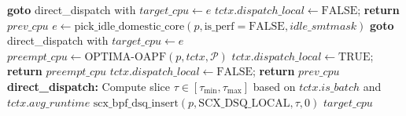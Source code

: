 \documentclass[conference]{IEEEtran}
\begin{document}
\begin{algorithm*}[t]
\begin{algorithmic}[1]
            \STATE \textbf{goto} direct\_dispatch with $target\_cpu \leftarrow e$
        \ENDIF
    \ENDIF
    \STATE $tctx.dispatch\_local \leftarrow \text{FALSE}$; \textbf{return} $prev\_cpu$
\ENDIF
\STATE $e \leftarrow \text{pick\_idle\_domestic\_core}(p, \text{is\_perf}=\text{FALSE}, idle\_smtmask)$
    \STATE \textbf{goto} direct\_dispatch with $target\_cpu \leftarrow e$
\ENDIF
{}
    \STATE $preempt\_cpu \leftarrow \text{OPTIMA-OAPF}(p, tctx, \mathcal{P})$
        \STATE $tctx.dispatch\_local \leftarrow \text{TRUE}$; \textbf{return} $preempt\_cpu$
    \ENDIF
\ENDIF
\STATE $tctx.dispatch\_local \leftarrow \text{FALSE}$; \textbf{return} $prev\_cpu$
\STATE \textbf{direct\_dispatch:}
\STATE Compute slice $\tau \in [\tau_{\min}, \tau_{\max}]$ based on $tctx.is\_batch$ and $tctx.avg\_runtime$
\STATE $\text{scx\_bpf\_dsq\_insert}(p, \text{SCX\_DSQ\_LOCAL}, \tau, 0)$
\RETURN $target\_cpu$
\end{algorithmic}
\end{algorithm*}
\end{document}
